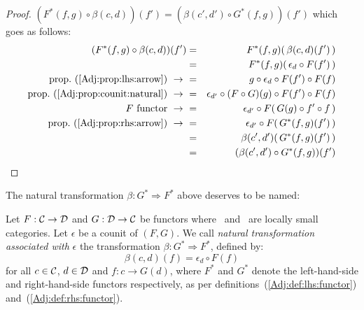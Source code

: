 \begin{proof}
    $(F^{*}(f,g)\circ\beta(c,d))(f')=(\beta(c',d')\circ G^{*}(f,g))(f')$
    which goes as follows:
        \begin{eqnarray*}(F^{*}(f,g)\circ\beta(c,d))(f')
            &=&F^{*}(f,g)(\,\beta(c,d)(f')\,)\\
            &=&F^{*}(f,g)(\,\epsilon_{d}\circ F(f')\,)\\
            \mbox{prop.~(\ref{Adj:prop:lhs:arrow})}\ \to\ 
            &=&g\circ \epsilon_{d}\circ F(f')\circ F(f)\\
            \mbox{prop.~(\ref{Adj:prop:counit:natural})}\ \to\ 
            &=&\epsilon_{d'}\circ (F\circ G)(g)\circ F(f')\circ F(f)\\
            \mbox{$F$ functor}\ \to\ 
            &=&\epsilon_{d'}\circ F(\,G(g)\circ f'\circ f\,)\\
            \mbox{prop.~(\ref{Adj:prop:rhs:arrow})}\ \to\ 
            &=&\epsilon_{d'}\circ F(\,G^{*}(f,g)(f')\,)\\
            &=&\beta(c',d')(\,G^{*}(f,g)(f')\,)\\
            &=&(\beta(c',d')\circ G^{*}(f,g))(f')\\
        \end{eqnarray*}
\end{proof}

The natural transformation $\beta:G^{*}\Rightarrow F^{*}$ above deserves to 
be named:
\begin{defin}\label{Adj:def:natural:associated:counit}
    Let $F:\mbox{$\cal C$}\to\mbox{$\cal D$}$ and $G:\mbox{$\cal D$}\to\mbox{$\cal C$}$ be functors where \Cat\ and \Dat\ 
    are locally small categories. Let $\epsilon$ be a counit of $(F,G)$. We call
    {\em natural transformation associated with} $\epsilon$ the transformation 
    $\beta:G^{*}\Rightarrow F^{*}$, defined by:
        \[
            \beta(c,d)(f)=\epsilon_{d}\circ F(f)
        \]
    for all $c\in\mbox{$\cal C$}$, $d\in\mbox{$\cal D$}$ and $f:c\to G(d)$, where $F^{*}$ and $G^{*}$ 
    denote the left-hand-side and right-hand-side functors respectively,
    as per definitions~(\ref{Adj:def:lhs:functor}) and~(\ref{Adj:def:rhs:functor}).
\end{defin}

